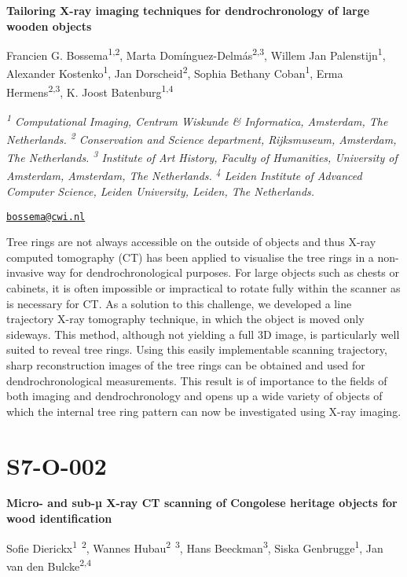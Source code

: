 \documentclass[
]{book}
\begin{document}
\textbf{Tailoring X-ray imaging techniques for dendrochronology of large wooden objects}

Francien G. Bossema\textsuperscript{1,2}, Marta Domínguez-Delmás\textsuperscript{2,3}, Willem Jan Palenstijn\textsuperscript{1}, Alexander Kostenko\textsuperscript{1}, Jan Dorscheid\textsuperscript{2}, Sophia Bethany Coban\textsuperscript{1}, Erma Hermens\textsuperscript{2,3}, K. Joost Batenburg\textsuperscript{1,4}

\emph{\textsuperscript{1} Computational Imaging, Centrum Wiskunde \& Informatica, Amsterdam, The Netherlands. \textsuperscript{2} Conservation and Science department, Rijksmuseum, Amsterdam, The Netherlands. \textsuperscript{3} Institute of Art History, Faculty of Humanities, University of Amsterdam, Amsterdam, The Netherlands. \textsuperscript{4} Leiden Institute of Advanced Computer Science, Leiden University, Leiden, The Netherlands.}

\href{mailto:bossema@cwi.nl}{\nolinkurl{bossema@cwi.nl}}

Tree rings are not always accessible on the outside of objects and thus X-ray computed tomography (CT) has been applied to visualise the tree rings in a non-invasive way for dendrochronological purposes. For large objects such as chests or cabinets, it is often impossible or impractical to rotate fully within the scanner as is necessary for CT. As a solution to this challenge, we developed a line trajectory X-ray tomography technique, in which the object is moved only sideways. This method, although not yielding a full 3D image, is particularly well suited to reveal tree rings. Using this easily implementable scanning trajectory, sharp reconstruction images of the tree rings can be obtained and used for dendrochronological measurements. This result is of importance to the fields of both imaging and dendrochronology and opens up a wide variety of objects of which the internal tree ring pattern can now be investigated using X-ray imaging.

\hypertarget{s7-o-002}{%
\section*{S7-O-002}\label{s7-o-002}}

\textbf{Micro- and sub-µ X-ray CT scanning of Congolese heritage objects for wood identification}

Sofie Dierickx\textsuperscript{1~2}, Wannes Hubau\textsuperscript{2~3}, Hans Beeckman\textsuperscript{3}, Siska Genbrugge\textsuperscript{1}, Jan van den Bulcke\textsuperscript{2,4}
\end{document}

